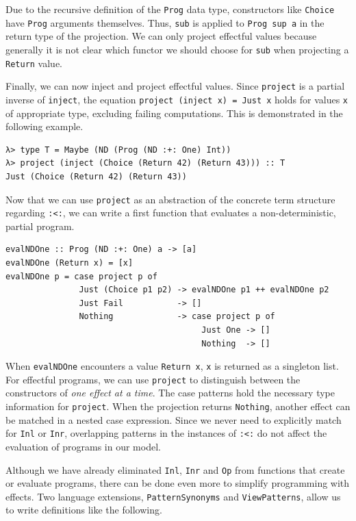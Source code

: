 \documentclass[a4paper, 11pt, fleqn, twoside]{scrreprt}
\newcommand{\todo}[1]{\marginpar{\textbf{TODO:} #1}}
\newcommand{\hinl}[1]{\texttt{#1}}
\begin{document}
Due to the recursive definition of the \hinl{Prog} data type, constructors like \hinl{Choice} have \hinl{Prog} arguments themselves.
Thus, \hinl{sub} is applied to \hinl{Prog sup a} in the return type of the projection.
We can only project effectful values because generally it is not clear which functor we should choose for \hinl{sub} when projecting a \hinl{Return} value.

Finally, we can now inject and project effectful values.
Since \hinl{project} is a partial inverse of \hinl{inject}, the equation \hinl{project (inject x) = Just x} holds for values \hinl{x} of appropriate type, excluding failing computations.
\todo{Does it hold?}
This is demonstrated in the following example.

\begin{verbatim}
λ> type T = Maybe (ND (Prog (ND :+: One) Int))
λ> project (inject (Choice (Return 42) (Return 43))) :: T
Just (Choice (Return 42) (Return 43))
\end{verbatim}

Now that we can use \hinl{project} as an abstraction of the concrete term structure regarding \hinl{:<:}, we can write a first function that evaluates a non-deterministic, partial program.

\begin{verbatim}
evalNDOne :: Prog (ND :+: One) a -> [a]
evalNDOne (Return x) = [x]
evalNDOne p = case project p of
               Just (Choice p1 p2) -> evalNDOne p1 ++ evalNDOne p2
               Just Fail           -> []
               Nothing             -> case project p of
                                        Just One -> []
                                        Nothing  -> []
\end{verbatim}

When \hinl{evalNDOne} encounters a value \hinl{Return x}, \hinl{x} is returned as a singleton list.
For effectful programs, we can use \hinl{project} to distinguish between the constructors of \textit{one effect at a time}.
The case patterns hold the necessary type information for \hinl{project}.
When the projection returns \hinl{Nothing}, another effect can be matched in a nested case expression.
Since we never need to explicitly match for \hinl{Inl} or \hinl{Inr}, overlapping patterns in the instances of \hinl{:<:} do not affect the evaluation of programs in our model.

Although we have already eliminated \hinl{Inl}, \hinl{Inr} and \hinl{Op} from functions that create or evaluate programs, there can be done even more to simplify programming with effects.
Two language extensions, \hinl{PatternSynonyms} and \hinl{ViewPatterns}, allow us to write definitions like the following.
\end{document}
